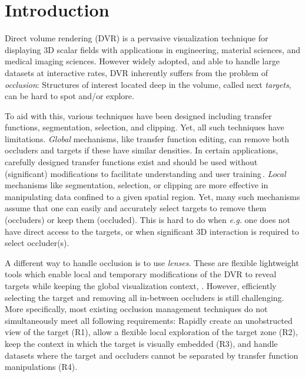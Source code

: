 \section{Introduction}
Direct volume rendering (DVR) is a pervasive visualization technique for displaying 3D scalar fields with applications in engineering, material sciences, and medical imaging sciences. However widely adopted, and able to handle large datasets at interactive rates, DVR inherently suffers from the problem of \emph{occlusion}: Structures of interest located deep in the volume, called next \emph{targets}, can be hard to spot and/or explore.

To aid with this, various techniques have been designed including transfer functions, segmentation, selection, and clipping. Yet, all such techniques have limitations.  \emph{Global} mechanisms, like transfer function editing, can remove both occluders and targets if these have similar densities. In certain applications, carefully designed transfer functions exist and should be used without (significant) modifications to facilitate understanding and user training\,\cite{4276082}. \emph{Local} mechanisms like segmentation, selection, or clipping are more effective in manipulating data confined to a given spatial region. Yet, many such mechanisms assume that one can easily and accurately select targets to remove them (occluders) or keep them (occluded). This is hard to do when \emph{e.g.} one does not have direct access to the targets, or when significant 3D interaction is required to select occluder(s).

A different way to handle occlusion is to use \emph{lenses}. These are flexible lightweight tools which enable local and temporary modifications of the DVR to reveal targets while keeping the global visualization context, \cite{595268,CGF:CGF12871,6327262}. However, efficiently selecting the target and  removing all in-between occluders is still challenging. More specifically, most existing occlusion management techniques do not simultaneously meet all following requirements: Rapidly create an unobstructed view of the target (R1), allow a flexible local exploration of the target zone (R2), keep the context in which the target is visually embedded (R3), and handle datasets where the target and occluders cannot 
be separated by transfer function manipulations (R4).

